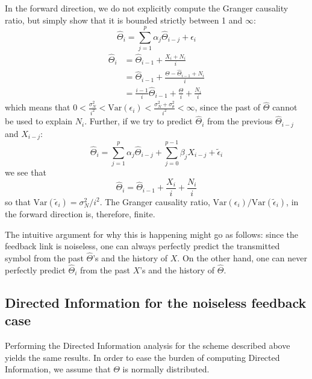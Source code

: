 \documentclass[letterpaper, 10pt, conference]{ieeeconf}
\begin{document}
In the forward direction, we do not explicitly compute the Granger causality ratio, but simply show that it is bounded strictly between 1 and $\infty$:
\begin{equation}
	\widehat\Theta_i = \sum_{j=1}^p{\alpha_j \widehat\Theta_{i-j}} + \epsilon_i \label{eq:ar-model-theta-theta}
\end{equation}
\begin{align*}
	\widehat\Theta_i &= \widehat\Theta_{i-1} + \frac{X_i + N_i}{i} \\
					 &= \widehat\Theta_{i-1} + \frac{\Theta - \widehat\Theta_{i-1} + N_i}{i} \\
					 &= \frac{i-1}{i} \widehat\Theta_{i-1} + \frac{\Theta}{i} + \frac{N_i}{i}
\end{align*}
which means that $0 < \frac{\sigma_N^2}{i^2} < \text{Var}(\epsilon_i) < \frac{\sigma_N^2 + \sigma_\theta^2}{i^2} < \infty$, since the past of $\widehat{\Theta}$ cannot be used to explain $N_i$.
Further, if we try to predict $\widehat\Theta_i$ from the previous $\widehat\Theta_{i-j}$ and $X_{i-j}$:
\begin{equation}
	\widehat\Theta_i = \sum_{j=1}^{p}{\alpha_j \widehat\Theta_{i-j}} + \sum_{j=0}^{p-1}{\beta_j X_{i-j}} + \tilde\epsilon_i \label{eq:ar-model-theta-theta-x}
\end{equation}
we see that
\begin{equation*}
	\widehat\Theta_i = \widehat\Theta_{i-1} + \frac{X_i}{i} + \frac{N_i}{i}
\end{equation*}
so that $\text{Var}(\tilde\epsilon_i) = \sigma_N^2/i^2$. The Granger causality ratio, $\text{Var}(\epsilon_i) / \text{Var}(\tilde\epsilon_i)$, in the forward direction is, therefore, finite.

The intuitive argument for why this is happening might go as follows: since the feedback link is noiseless, one can always perfectly predict the transmitted symbol from the past $\widehat\Theta$'s and the history of $X$. On the other hand, one can never perfectly predict $\widehat\Theta_i$ from the past $X$'s and the history of $\widehat\Theta$.


\subsection{Directed Information for the noiseless feedback case}
\label{sec:dir-info-noiseless}

Performing the Directed Information analysis for the scheme described above yields the same results. In order to ease the burden of computing Directed Information, we assume that $\Theta$ is normally distributed.
\end{document}
